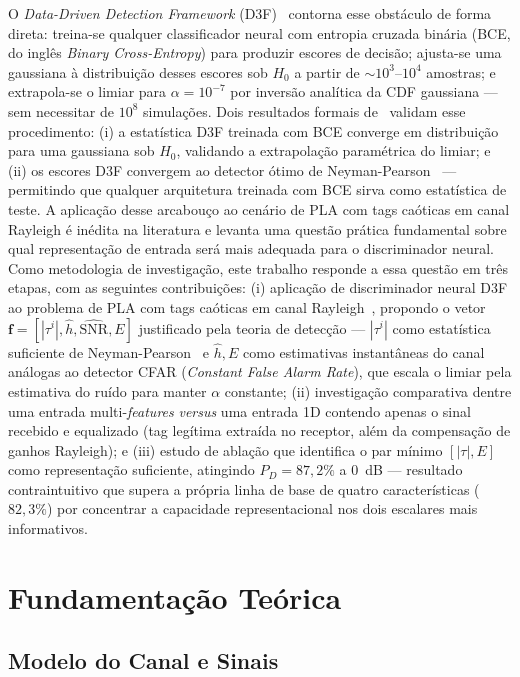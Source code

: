 \documentclass{sbrt}
\begin{document}
O \textit{Data-Driven Detection Framework} (D3F)~\cite{ref_braca} contorna esse obstáculo de forma direta: treina-se qualquer classificador neural com entropia cruzada binária (BCE, do inglês \textit{Binary Cross-Entropy}) para produzir escores de decisão; ajusta-se uma gaussiana à distribuição desses escores sob $H_0$ a partir de $\sim\!10^3$--$10^4$ amostras; e extrapola-se o limiar para $\alpha = 10^{-7}$ por inversão analítica da CDF gaussiana — sem necessitar de $10^8$ simulações. Dois resultados formais de~\cite{ref_braca} validam esse procedimento: (i) a estatística D3F treinada com BCE converge em distribuição para uma gaussiana sob $H_0$, validando a extrapolação paramétrica do limiar; e (ii) os escores D3F convergem ao detector ótimo de Neyman-Pearson~\cite{ref_poor} — permitindo que qualquer arquitetura treinada com BCE sirva como estatística de teste. A aplicação desse arcabouço ao cenário de PLA com tags caóticas em canal Rayleigh é inédita na literatura e levanta uma questão prática fundamental sobre qual representação de entrada será mais adequada para o discriminador neural. Como metodologia de investigação, este trabalho responde a essa questão em três etapas, com as seguintes contribuições: (i) aplicação de discriminador neural D3F ao problema de PLA com tags caóticas em canal Rayleigh~\cite{ref_joao}, propondo o vetor $\mathbf{f} = [|\tau^i|, \hat{h}, \widehat{\text{SNR}}, E]$ justificado pela teoria de detecção — $|\tau^i|$ como estatística suficiente de Neyman-Pearson~\cite{ref_poor} e $\hat{h}, E$ como estimativas instantâneas do canal análogas ao detector CFAR (\textit{Constant False Alarm Rate}), que escala o limiar pela estimativa do ruído para manter $\alpha$ constante; (ii) investigação comparativa dentre uma entrada multi-\textit{features} \textit{versus} uma entrada 1D contendo apenas o sinal recebido e equalizado (tag legítima extraída no receptor, além da compensação de ganhos Rayleigh); e (iii) estudo de ablação que identifica o par mínimo $[|\tau|, E]$ como representação suficiente, atingindo $P_D = 87{,}2\%$ a 0~dB — resultado contraintuitivo que supera a própria linha de base de quatro características ($82{,}3\%$) por concentrar a capacidade representacional nos dois escalares mais informativos.



\section{Fundamentação Teórica}

\subsection{Modelo do Canal e Sinais}
\end{document}
